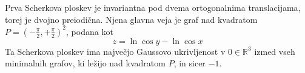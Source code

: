 \documentclass[8pt]{beamer}
\theoremstyle{definition}
\theoremstyle{remark}
\theoremstyle{plain}
\numberwithin{equation}{section}  %
\begin{document}
\begin{frame}
\begin{columns}
        \begin{column}{0.5\textwidth}
            Prva Scherkova ploskev je invariantna pod dvema ortogonalnima translacijama, torej je dvojno preiodična. Njena glavna veja je graf nad kvadratom $P=\left(-\frac{\pi}{2}, +\frac{\pi}{2}\right)^2$, podana kot
            \begin{equation*}
                z = \ln{\cos{y}} - \ln{\cos{x}}
            \end{equation*}
            Ta Scherkova ploskev ima največjo Gaussovo ukrivljenost v $0\in \mathbb{R}^3$ izmed vseh minimalnih grafov, ki ležijo nad kvadratom $P$, in sicer $-1$. 

            \vspace{0.8em}


\end{column}
\end{columns}
\end{frame}
\end{document}
